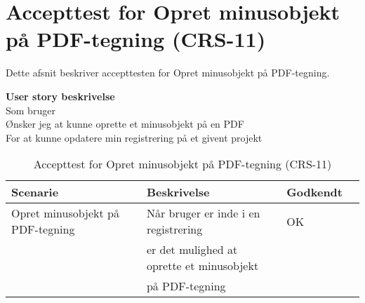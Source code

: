 \section{Accepttest for Opret minusobjekt på PDF-tegning (CRS-11)}
Dette afsnit beskriver accepttesten for Opret minusobjekt på PDF-tegning.

\textbf{User story beskrivelse} \\
Som bruger \\
Ønsker jeg at kunne oprette et minusobjekt på en PDF \\
For at kunne opdatere min registrering på et givent projekt

\begin{table}[H]
	\centering
	\begin{tabular}{|ll|l|ll|} \hline
		\textbf{Scenarie} &  & \textbf{Beskrivelse}&  \textbf{Godkendt}&  \\ \hline
		Opret minusobjekt på PDF-tegning&  &  Når bruger er inde i en registrering &  OK&  \\
		& & er det mulighed at oprette et minusobjekt& & \\ 
		& & på PDF-tegning& & \\ \hline
	\end{tabular}
	\caption{Accepttest for Opret minusobjekt på PDF-tegning (CRS-11)}
	\label{AcceptMinus}
\end{table}

\clearpage